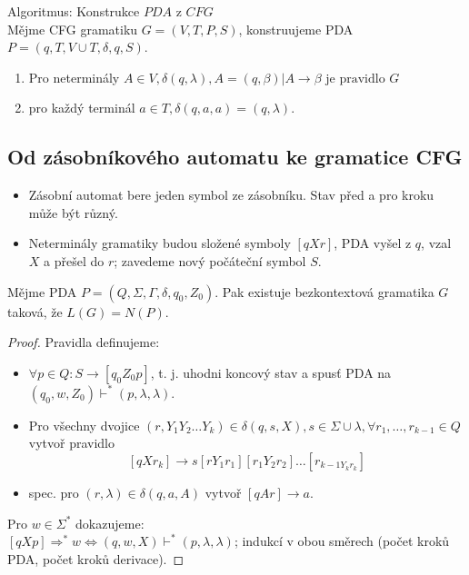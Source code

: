 \documentclass[../main.tex]{subfiles}
\begin{document}
\begin{theorem}
    Algoritmus: Konstrukce $PDA$ z $CFG$\\

    Mějme CFG gramatiku $G = (V,T,P,S)$, konstruujeme PDA $P = ({q},T,V\cup T,\delta,q,S)$.
    \begin{enumerate}
        \item Pro neterminály $A \in V, \delta(q,\lambda),A = {(q,\beta)|A \rightarrow \beta \text{ je pravidlo } G}$
        \item pro každý terminál $a \in T, \delta(q,a,a) = {(q,\lambda)}$.
    \end{enumerate}
\end{theorem}

\subsection{Od zásobníkového automatu ke gramatice CFG}
\begin{itemize}
    \item Zásobní automat bere jeden symbol ze zásobníku. Stav před a pro kroku může být různý.
    \item Neterminály gramatiky budou složené symboly $[qXr]$, PDA vyšel z $q$, vzal $X$ a přešel do $r$;
    zavedeme nový počáteční symbol $S$.
\end{itemize}
\begin{theorem}
    Mějme PDA $P = (Q,\Sigma,\Gamma,\delta,q_0,Z_0)$. Pak existuje bezkontextová gramatika $G$ taková, že $L(G) = N(P)$.
    \begin{proof}
        Pravidla definujeme:
        \begin{itemize}
            \item $\forall p \in Q : S \rightarrow [q_0Z_0p]$, t. j. uhodni koncový stav a spusť PDA na $(q_0,w,Z_0) \vdash^* (p,\lambda,\lambda)$.
            \item Pro všechny dvojice $(r,Y_1Y_2 \dots Y_k) \in \delta(q,s,X), s \in \Sigma \cup {\lambda}, \forall r_1,\dots,r_{k-1} \in Q$ vytvoř pravidlo
            \[[qXr_k] \rightarrow s[rY_1r_1][r_1Y_2r_2]\dots[r_{k-1Y_kr_k}]\]
            \item spec. pro $(r,\lambda) \in \delta(q,a,A)$ vytvoř $[qAr] \rightarrow a$.
        \end{itemize}
        Pro $w\in \Sigma^*$ dokazujeme:\\
        $[qXp]\Rightarrow^*w \Leftrightarrow (q,w,X)\vdash^*(p,\lambda,\lambda)$; indukcí v obou směrech (počet kroků PDA, počet kroků derivace).
    \end{proof}
\end{theorem}
\end{document}
